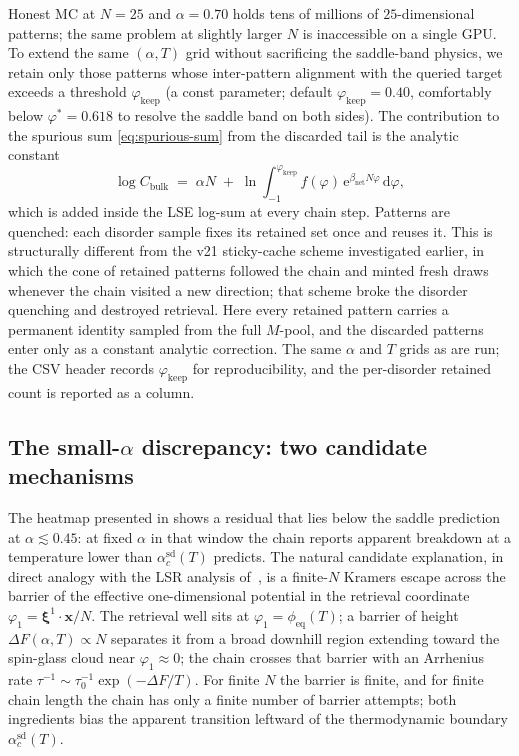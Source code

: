 \documentclass[11pt]{article}
\newcommand{\bxi}{\boldsymbol{\xi}}
\newcommand{\bx}{\bm{x}}
\newcommand{\e}{{\mathrm{e}}}
\newcommand{\dd}{{\mathrm{d}}}
\newcommand{\Bnet}{\beta_{\mathrm{net}}}
\newcommand{\phieq}{\phi_{\mathrm{eq}}}
\newcommand{\acSd}{\alpha_c^{\mathrm{sd}}}
\begin{document}
Honest MC at $N = 25$ and $\alpha = 0.70$ holds tens of millions of
$25$-dimensional patterns; the same problem at slightly larger $N$ is
inaccessible on a single GPU. To extend the same $(\alpha, T)$ grid
without sacrificing the saddle-band physics, we retain only those
patterns whose inter-pattern alignment with the queried target exceeds
a threshold $\varphi_{\mathrm{keep}}$ (a const parameter; default
$\varphi_{\mathrm{keep}} = 0.40$, comfortably below
$\varphi^{*} = 0.618$ to resolve the saddle band on both sides). The
contribution to the spurious sum \eqref{eq:spurious-sum} from the
discarded tail is the analytic constant
\begin{equation}
\log C_{\mathrm{bulk}} \;=\; \alpha N \;+\;
\ln \!\int_{-1}^{\varphi_{\mathrm{keep}}}
        f(\varphi)\,\e^{\Bnet N \varphi}\,\dd\varphi,
\label{eq:Cbulk}
\end{equation}
which is added inside the LSE log-sum at every chain step. Patterns are
quenched: each disorder sample fixes its retained set once and reuses
it. This is structurally different from the v21 sticky-cache scheme
investigated earlier, in which the cone of retained patterns followed
the chain and minted fresh draws whenever the chain visited a new
direction; that scheme broke the disorder quenching and destroyed
retrieval. Here every retained pattern carries a permanent identity
sampled from the full $M$-pool, and the discarded patterns enter only as
a constant analytic correction. The same $\alpha$ and $T$ grids as
 are run; the CSV header records
$\varphi_{\mathrm{keep}}$ for reproducibility, and the per-disorder
retained count is reported as a column.

\subsection{The small-$\alpha$ discrepancy: two candidate mechanisms}
\label{sec:mc:smallalpha}

The heatmap presented in  shows a residual that lies
below the saddle prediction at $\alpha \lesssim 0.45$: at fixed
$\alpha$ in that window the chain reports apparent breakdown at a
temperature lower than $\acSd(T)$ predicts. The natural candidate
explanation, in direct analogy with the LSR analysis
of~\citep{petrova2026metastable}, is a finite-$N$ Kramers escape across
the barrier of the effective one-dimensional potential in the retrieval
coordinate $\varphi_1 = \bxi^1\!\cdot\!\bx/N$. The retrieval well sits
at $\varphi_1 = \phieq(T)$; a barrier of height $\Delta F(\alpha, T)
\propto N$ separates it from a broad downhill region extending toward
the spin-glass cloud near $\varphi_1\!\approx\!0$; the chain crosses
that barrier with an Arrhenius rate $\tau^{-1} \sim \tau_0^{-1}
\exp(-\Delta F/T)$. For finite $N$ the barrier is finite, and for
finite chain length the chain has only a finite number of barrier
attempts; both ingredients bias the apparent transition leftward of
the thermodynamic boundary $\acSd(T)$.
\end{document}
